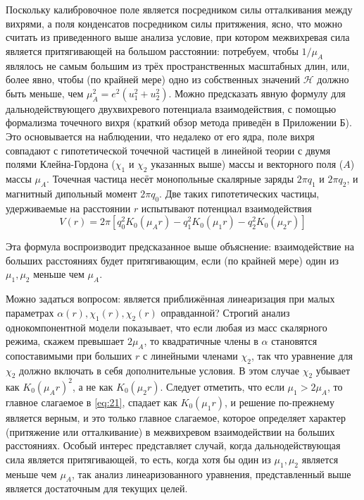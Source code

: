 Поскольку калибровочное поле является посредником силы отталкивания между 
вихрями, а поля конденсатов посредником силы притяжения, ясно, что можно 
считать из приведенного выше анализа условие, при котором межвихревая сила 
является притягивающей на большом расстоянии: потребуем, чтобы \( 1/\mu_A \) 
являлось не самым большим из трёх пространственных масштабных длин, или, 
более явно, чтобы (по крайней мере) одно из собственных значений 
\( \mathcal{H} \) должно быть меньше, чем \( \mu_A^2 = e^2(u_1^2 + u_2^2) \). 
Можно предсказать явную формулу для дальнодействующего двухвихревого 
потенциала взаимодействия, с помощью формализма точечного вихря \cite{bib:19} 
(краткий обзор метода приведён в Приложении Б). Это основывается на 
наблюдении, что недалеко от его ядра, поле вихря совпадают с гипотетической 
точечной частицей в линейной теории с двумя полями Клейна-Гордона 
(\( \chi_1 \) и \( \chi_2 \) указанных выше) массы и векторного поля (\( A \)) 
массы \( \mu_A \). Точечная частица несёт монопольные скалярные заряды 
\( 2\pi q_1 \) и \( 2\pi q_2 \), и магнитный дипольный момент \( 2\pi q_0 \). 
Две таких гипотетических частицы, удерживаемые на расстоянии \( r \) 
испытывают потенциал взаимодействия
\begin{equation}
    V(r) = 2\pi\left[ q_0^2 K_0(\mu_A r) - q_1^2 K_0(\mu_1 r) - 
        q_2^2 K_0(\mu_2 r) \right]
    \label{eq:22}
\end{equation}

Эта формула воспроизводит предсказанное выше объяснение: взаимодействие на 
больших расстояниях будет притягивающим, если (по крайней мере) один из 
\( \mu_1, \mu_2 \) меньше чем \( \mu_A \). 

Можно задаться вопросом: является приближённая линеаризация при малых 
параметрах \( \alpha(r), \chi_1(r), \chi_2(r) \) оправданной? Строгий анализ 
однокомпонентной модели \cite{bib:20} показывает, что если любая из масс 
скалярного режима, скажем превышает \( 2\mu_A \), то квадратичные члены в 
\( \alpha \) становятся сопоставимыми при больших \( r \) с линейными членами 
\( \chi_2 \), так что уравнение для \( \chi_2 \) должно включать в себя 
дополнительные условия. В этом случае \( \chi_2 \) убывает как 
\( K_0(\mu_A r)^2 \), а не как \( K_0(\mu_2 r) \). Следует отметить, что если 
\( \mu_1 > 2\mu_A \), то главное слагаемое в \eqref{eq:21}, спадает как 
\( K_0(\mu_1 r) \), и решение по-прежнему является верным, и это только 
главное слагаемое, которое определяет характер (притяжение или отталкивание) в 
межвихревом взаимодействии на больших расстояниях. Особый интерес представляет 
случай, когда дальнодействующая сила является притягивающей, то есть, когда 
хотя бы один из \( \mu_1, \mu_2 \) является меньше чем \( \mu_A \), так 
анализ линеаризованного уравнения, представленный выше является достаточным 
для текущих целей. \cite{bib:main}

\newpage